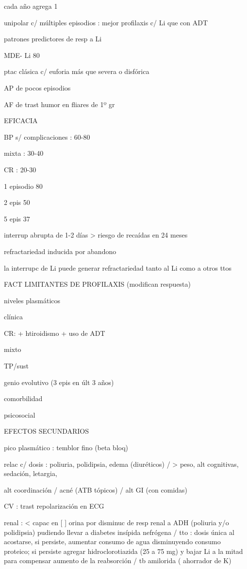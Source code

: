 cada año agrega 1%

unipolar c/ múltiples episodios : mejor profilaxis c/ Li que con ADT

patrones predictores de resp a Li

MDE- Li 80%

ptac clásica c/ euforia más que severa o disfórica

AP de pocos episodios

AF de trast humor en fliares de 1º gr

EFICACIA

BP s/ complicaciones : 60-80%

mixta : 30-40%

CR : 20-30%

1 episodio 80%

2 epis 50%

5 epis 37%

interrup abrupta de 1-2 días > riesgo de recaídas en 24 meses

refractariedad inducida por abandono

la interrupc de Li puede generar refractariedad tanto al Li como a otros ttos

FACT LIMITANTES DE PROFILAXIS (modifican respuesta)

niveles plasmáticos

clínica

CR: + htiroidismo + uso de ADT

mixto

TP/sust

genio evolutivo (3 epis en últ 3 años)

comorbilidad

psicosocial

EFECTOS SECUNDARIOS

pico plasmático : temblor fino (beta bloq)

relac c/ dosis : poliuria, polidipsia, edema (diuréticos) / > peso, alt cognitivas, sedación, letargia,

alt coordinación / acné (ATB tópicos) / alt GI (con comidas)

CV : trast repolarización en ECG

renal : < capac en [ ] orina por disminuc de resp renal a ADH (poliuria y/o polidipsia) pudiendo llevar a diabetes insípida nefrógena / tto : dosis única al acostarse, si persiste, aumentar consumo de agua disminuyendo consumo proteico; si persiste agregar hidroclorotiazida (25 a 75 mg) y bajar Li a la mitad para compensar aumento de la reabsorción / tb amilorida ( ahorrador de K)

